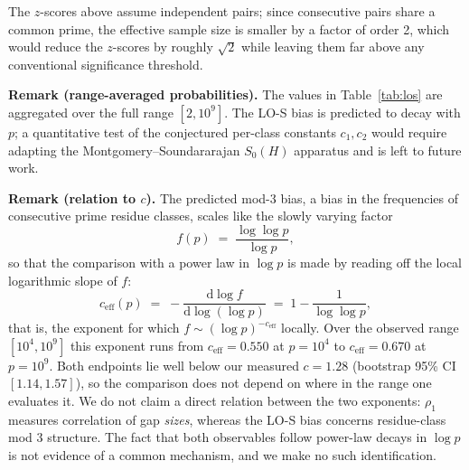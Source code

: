 \documentclass[11pt]{article}
\begin{document}
\noindent The $z$-scores above assume independent pairs; since
consecutive pairs share a common prime, the effective sample size is
smaller by a factor of order 2, which would reduce the $z$-scores by
roughly $\sqrt{2}$ while leaving them far above any conventional
significance threshold.

\noindent\textbf{Remark (range-averaged probabilities).} The values
in Table~\ref{tab:los} are aggregated over the full range
$[2, 10^9]$. The LO-S bias is predicted to decay with $p$; a
quantitative test of the conjectured per-class constants $c_1, c_2$
would require adapting the Montgomery--Soundararajan $S_0(H)$
apparatus \cite{MontgomerySoundararajan2004} and is left to future
work.

\noindent\textbf{Remark (relation to $c$).} The predicted mod-3 bias,
a bias in the frequencies of consecutive prime residue classes, scales
like the slowly varying factor
\begin{equation}
f(p) \;=\; \frac{\log\log p}{\log p},
\end{equation}
so that the comparison with a power law in $\log p$ is made by reading
off the local logarithmic slope of $f$:
\begin{equation}
c_{\text{eff}}(p) \;=\; -\frac{\mathrm{d}\log f}
{\mathrm{d}\log(\log p)} \;=\; 1 - \frac{1}{\log\log p},
\label{eq:ceff}
\end{equation}
that is, the exponent for which $f \sim (\log p)^{-c_{\text{eff}}}$ locally.
Over the observed range $[10^4, 10^9]$ this exponent runs from
$c_{\text{eff}} = 0.550$ at $p = 10^4$ to $c_{\text{eff}} = 0.670$ at
$p = 10^9$. Both endpoints lie well below our measured
$c = 1.28$ (bootstrap 95\% CI $[1.14, 1.57]$), so the comparison does
not depend on where in the range one evaluates it. We do not
claim a direct relation between the two exponents: $\rho_1$ measures
correlation of gap \emph{sizes}, whereas the LO-S bias concerns
residue-class mod 3 structure. The fact that both observables follow
power-law decays in $\log p$ is not evidence of a common mechanism,
and we make no such identification.
\end{document}
